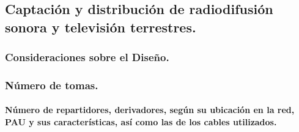 \subsection{Captación y distribución de radiodifusión sonora y televisión terrestres.}
\subsubsection{Consideraciones sobre el Diseño.}
\subsubsection{Número de tomas.}
\paragraph{Número de repartidores, derivadores, según su ubicación en la red, PAU y sus características, así como las de los cables utilizados.}